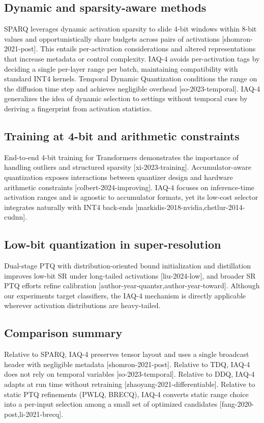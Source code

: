 \documentclass{article}
\begin{document}
\subsection{Dynamic and sparsity-aware methods}
SPARQ leverages dynamic activation sparsity to slide 4-bit windows within 8-bit values and opportunistically share budgets across pairs of activations [shomron-2021-post]. This entails per-activation considerations and altered representations that increase metadata or control complexity. IAQ-4 avoids per-activation tags by deciding a single per-layer range per batch, maintaining compatibility with standard INT4 kernels. Temporal Dynamic Quantization conditions the range on the diffusion time step and achieves negligible overhead [so-2023-temporal]. IAQ-4 generalizes the idea of dynamic selection to settings without temporal cues by deriving a fingerprint from activation statistics.

\subsection{Training at 4-bit and arithmetic constraints}
End-to-end 4-bit training for Transformers demonstrates the importance of handling outliers and structured sparsity [xi-2023-training]. Accumulator-aware quantization exposes interactions between quantizer design and hardware arithmetic constraints [colbert-2024-improving]. IAQ-4 focuses on inference-time activation ranges and is agnostic to accumulator formats, yet its low-cost selector integrates naturally with INT4 back-ends [markidis-2018-nvidia,chetlur-2014-cudnn].

\subsection{Low-bit quantization in super-resolution}
Dual-stage PTQ with distribution-oriented bound initialization and distillation improves low-bit SR under long-tailed activations [liu-2024-low], and broader SR PTQ efforts refine calibration [author-year-quantsr,author-year-toward]. Although our experiments target classifiers, the IAQ-4 mechanism is directly applicable wherever activation distributions are heavy-tailed.

\subsection{Comparison summary}
Relative to SPARQ, IAQ-4 preserves tensor layout and uses a single broadcast header with negligible metadata [shomron-2021-post]. Relative to TDQ, IAQ-4 does not rely on temporal variables [so-2023-temporal]. Relative to DDQ, IAQ-4 adapts at run time without retraining [zhaoyang-2021-differentiable]. Relative to static PTQ refinements (PWLQ, BRECQ), IAQ-4 converts static range choice into a per-input selection among a small set of optimized candidates [fang-2020-post,li-2021-brecq].
\end{document}

